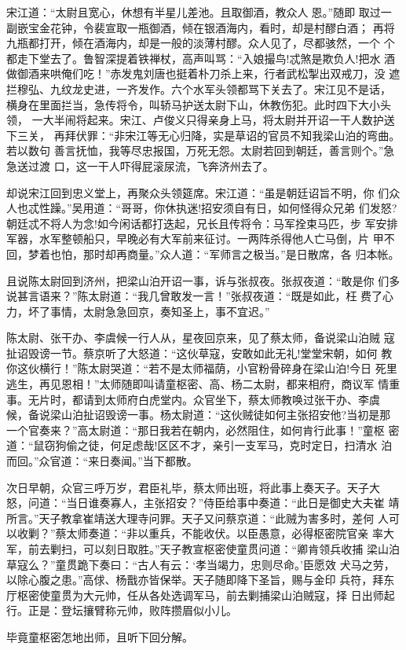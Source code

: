 宋江道：“太尉且宽心，休想有半星儿差池。且取御酒，教众人恩。”随即
取过一副嵌宝金花钟，令裴宣取一瓶御酒，倾在银酒海内，看时，却是村醪白酒；
再将九瓶都打开，倾在酒海内，却是一般的淡薄村醪。众人见了，尽都骇然，一个
个都走下堂去了。鲁智深提着铁禅杖，高声叫骂：“入娘撮鸟!忒煞是欺负人!把水
酒做御酒来哄俺们吃！”赤发鬼刘唐也挺着朴刀杀上来，行者武松掣出双戒刀，没
遮拦穆弘、九纹龙史进，一齐发作。六个水军头领都骂下关去了。宋江见不是话，
横身在里面拦当，急传将令，叫轿马护送太尉下山，休教伤犯。此时四下大小头领，
一大半闹将起来。宋江、卢俊义只得亲身上马，将太尉并开诏一干人数护送下三关，
再拜伏罪：“非宋江等无心归降，实是草诏的官员不知我梁山泊的弯曲。若以数句
善言抚恤，我等尽忠报国，万死无怨。太尉若回到朝廷，善言则个。”急急送过渡
口，这一干人吓得屁滚尿流，飞奔济州去了。

却说宋江回到忠义堂上，再聚众头领筵席。宋江道：“虽是朝廷诏旨不明，你
们众人也忒性躁。”吴用道：“哥哥，你休执迷!招安须自有日，如何怪得众兄弟
们发怒?朝廷忒不将人为念!如今闲话都打迭起，兄长且传将令：马军拴束马匹，步
军安排军器，水军整顿船只，早晚必有大军前来征讨。一两阵杀得他人亡马倒，片
甲不回，梦着也怕，那时却再商量。”众人道：“军师言之极当。”是日散席，各
归本帐。

且说陈太尉回到济州，把梁山泊开诏一事，诉与张叔夜。张叔夜道：“敢是你
们多说甚言语来？”陈太尉道：“我几曾敢发一言！”张叔夜道：“既是如此，枉
费了心力，坏了事情，太尉急急回京，奏知圣上，事不宜迟。”

陈太尉、张干办、李虞候一行人从，星夜回京来，见了蔡太师，备说梁山泊贼
寇扯诏毁谤一节。蔡京听了大怒道：“这伙草寇，安敢如此无礼!堂堂宋朝，如何
教你这伙横行！”陈太尉哭道：“若不是太师福荫，小官粉骨碎身在梁山泊!今日
死里逃生，再见恩相！”太师随即叫请童枢密、高、杨二太尉，都来相府，商议军
情重事。无片时，都请到太师府白虎堂内。众官坐下，蔡太师教唤过张干办、李虞
候，备说梁山泊扯诏毁谤一事。杨太尉道：“这伙贼徒如何主张招安他?当初是那
一个官奏来？”高太尉道：“那日我若在朝内，必然阻住，如何肯行此事！”童枢
密道：“鼠窃狗偷之徒，何足虑哉!区区不才，亲引一支军马，克时定日，扫清水
泊而回。”众官道：“来日奏闻。”当下都散。

次日早朝，众官三呼万岁，君臣礼毕，蔡太师出班，将此事上奏天子。天子大
怒，问道：“当日谁奏寡人，主张招安？”侍臣给事中奏道：“此日是御史大夫崔
靖所言。”天子教拿崔靖送大理寺问罪。天子又问蔡京道：“此贼为害多时，差何
人可以收剿？”蔡太师奏道：“非以重兵，不能收伏。以臣愚意，必得枢密院官亲
率大军，前去剿扫，可以刻日取胜。”天子教宣枢密使童贯问道：“卿肯领兵收捕
梁山泊草寇么？”童贯跪下奏曰：“古人有云：‘孝当竭力，忠则尽命。’臣愿效
犬马之劳，以除心腹之患。”高俅、杨戬亦皆保举。天子随即降下圣旨，赐与金印
兵符，拜东厅枢密使童贯为大元帅，任从各处选调军马，前去剿捕梁山泊贼寇，择
日出师起行。正是：登坛攘臂称元帅，败阵攒眉似小儿。

毕竟童枢密怎地出师，且听下回分解。